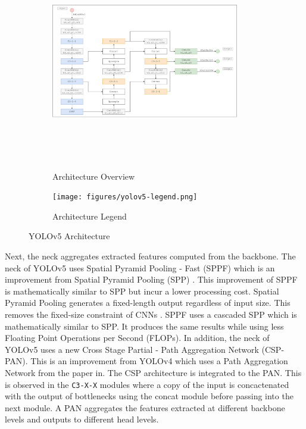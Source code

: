 \documentclass[12pt,a4paper,fleqn]{report}
\begin{document}
\begin{figure}[htbp]
    \centering
    \begin{subfigure}[htbp]{\textwidth}
        \begin{center}
            \includegraphics[width=0.9\textwidth,height=9.5cm]{figures/yolov5-arch.png}
        \end{center}
        \caption{Architecture Overview}
        \label{fig:yolov5-architecture-overview}
    \end{subfigure}
    \centering
    \begin{subfigure}[htbp]{\textwidth}
        \begin{center}
            \texttt{[image: figures/yolov5-legend.png]}
        \end{center}
        \caption{Architecture Legend}
        \label{fig:yolov5-architecture-legend}
    \end{subfigure}
    \caption{YOLOv5 Architecture}
    \label{fig:yolov5-architecture}
\end{figure}

Next, the neck aggregates extracted features computed from the backbone.
The neck of YOLOv5 uses Spatial Pyramid Pooling - Fast (SPPF) which is an improvement from Spatial Pyramid
Pooling (SPP) \cite{spp:2014}.
This improvement of SPPF is mathematically similar to SPP but incur a lower processing cost.
Spatial Pyramid Pooling generates a fixed-length output regardless of input size.
This removes the fixed-size constraint of CNNs \cite{spp:2014}.
SPPF uses a cascaded SPP which is mathematically similar to SPP.
It produces the same results while using less Floating Point Operations per Second (FLOPs).
In addition, the neck of YOLOv5 uses a new Cross Stage Partial - Path Aggregation Network (CSP-PAN).
This is an improvement from YOLOv4 which uses a Path Aggregation Network from the paper
in\cite{pan:2018}.
The CSP architecture is integrated to the PAN.
This is observed in the \texttt{C3-X-X} modules where a copy of the input is concactenated with the
output of bottlenecks using the concat module before passing into the next module.
A PAN aggregates the features extracted at different backbone levels and outputs to different
head levels.
\end{document}
